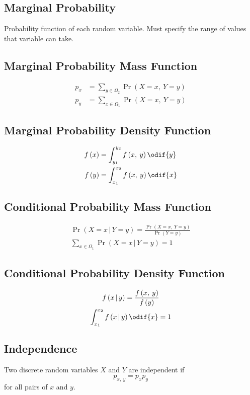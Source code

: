 \documentclass{article}
\begin{document}
\begin{multicols}{3}
    \subsection{Marginal Probability}
    Probability function of each random variable.
    Must specify the range of values that variable can take.
    \subsection{Marginal Probability Mass Function}
    \begin{align*}
        p_x & = \sum_{y \in \Omega_2} \Pr{\left( X = x,\: Y = y \right)} \\
        p_y & = \sum_{x \in \Omega_1} \Pr{\left( X = x,\: Y = y \right)}
    \end{align*}
    \subsection{Marginal Probability Density Function}
    \begin{align*}
        f\left( x \right) & = \int_{y_1}^{y_2} f\left( x,\: y \right) \odif{y} \\
        f\left( y \right) & = \int_{x_1}^{x_2} f\left( x,\: y \right) \odif{x}
    \end{align*}
    \subsection{Conditional Probability Mass Function}
    \begin{gather*}
        \Pr{\left( X = x \,\vert\, Y = y \right)} = \frac{\Pr{\left( X = x,\: Y = y \right)}}{\Pr{\left( Y = y \right)}} \\
        \sum_{x \in \Omega_1} \Pr{\left( X = x \,\vert\, Y = y \right)} = 1
    \end{gather*}
    \subsection{Conditional Probability Density Function}
    \begin{gather*}
        f\left( x \,\vert\, y \right) = \frac{f\left( x,\: y \right)}{f\left( y \right)} \\
        \int_{x_1}^{x_2} f\left( x \,\vert\, y \right) \odif{x} = 1
    \end{gather*}
    \subsection{Independence}
    Two discrete random variables \(X\) and \(Y\) are independent if
    \begin{equation*}
        p_{x,\:y} = p_x p_y
    \end{equation*}
    for all pairs of \(x\) and \(y\).


\end{multicols}
\end{document}
